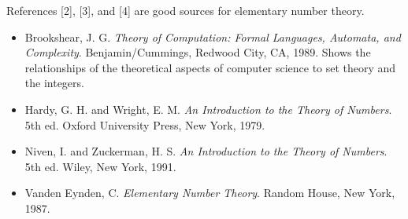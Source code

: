 {\small
References [2], [3], and [4] are good sources for elementary number
theory. 
\begin{itemize}
 
\item[{\bf [1]}]
Brookshear, J. G. {\it Theory of Computation: Formal Languages,
Automata, and Complexity}.  Benjamin/Cummings, Redwood City, CA, 1989.
Shows the relationships of the theoretical aspects of computer science
to set theory and the integers.
 
\item[{\bf [2]}]
Hardy, G. H. and Wright, E. M. {\it An Introduction to the Theory of
Numbers}.  5th ed. Oxford University Press, New York, 1979. 
 
 
\item[{\bf [3]}]
Niven, I. and Zuckerman, H. S. {\it An Introduction to the Theory of
Numbers}.  5th ed. Wiley, New York, 1991. 
 
\item[{\bf [4]}]
Vanden Eynden, C. {\it Elementary Number Theory}. Random House, New
York, 1987. 
\end{itemize}
 
}
 
 
 
 
 
